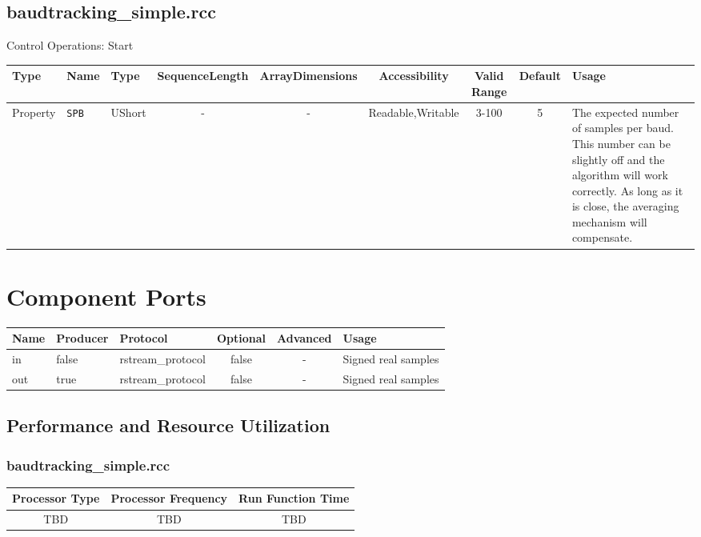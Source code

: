 \documentclass{article}
\def\comp{baudtracking\_simple}
\begin{document}
\begin{landscape}
	\subsection*{\comp.rcc}
	Control Operations: Start\newline\newline
	\begin{scriptsize}
		\begin{tabular}{|p{3cm}|p{2cm}|p{1cm}|c|c|c|c|c|p{5cm}|}
			\hline
			\rowcolor{blue}
			Type     & Name       & Type   & SequenceLength & ArrayDimensions & Accessibility     & Valid Range & Default & Usage                                                                                                                                                                             \\
			\hline
			Property & \verb+SPB+ & UShort & -              & -               & Readable,Writable & 3-100       & 5       & The expected number of samples per baud.  This number can be slightly off and the algorithm will work correctly. As long as it is close, the averaging mechanism will compensate. \\
			\hline
		\end{tabular}
	\end{scriptsize}

	\section*{Component Ports}
	\begin{scriptsize}
		\begin{tabular}{|M{2cm}|M{1.5cm}|M{4cm}|c|c|M{9cm}|}
			\hline
			\rowcolor{blue}
			Name & Producer & Protocol          & Optional & Advanced & Usage               \\
			\hline
			in   & false    & rstream\_protocol & false    & -        & Signed real samples \\
			\hline
			out  & true     & rstream\_protocol & false    & -        & Signed real samples \\
			\hline
		\end{tabular}
	\end{scriptsize}
\end{landscape}

\begin{landscape}
\section*{Performance and Resource Utilization}
\subsubsection*{\comp.rcc}
\begin{scriptsize}
	\begin{tabular}{|c|c|c|}
		\hline
		Processor Type & Processor Frequency & Run Function Time \\
		\hline
		TBD            & TBD                 & TBD               \\
		\hline
	\end{tabular}
\end{scriptsize}
\end{landscape}
\end{document}
